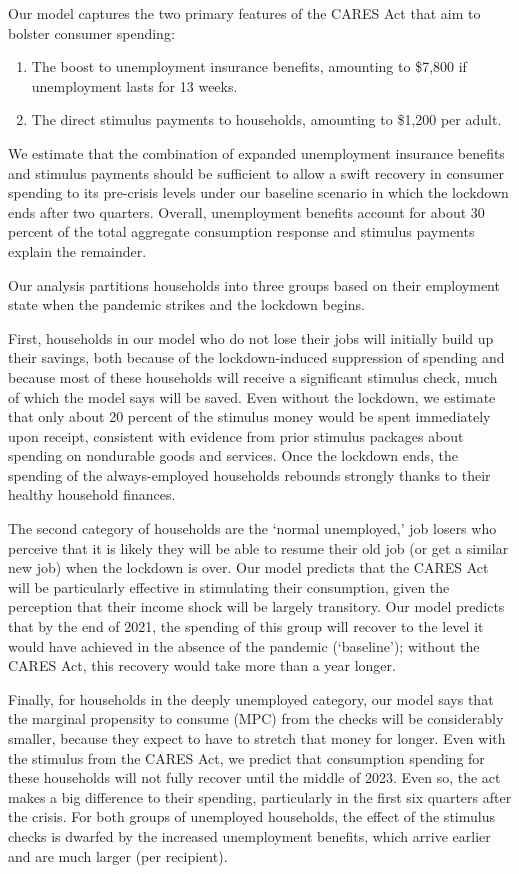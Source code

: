 \documentclass[titlepage]{\econtex}
\begin{document}
Our model captures the two primary features of the CARES Act that aim to bolster consumer spending:
\begin{enumerate}
\item The boost to unemployment insurance benefits, amounting to \$7,800 if unemployment lasts for 13 weeks.
\item The direct stimulus payments to households, amounting to \$1,200 per adult.
\end{enumerate}

We estimate that the combination of expanded unemployment insurance benefits and stimulus payments should be sufficient to allow a swift recovery in consumer spending to its pre-crisis levels under our baseline scenario in which the lockdown ends after two quarters. 
Overall, unemployment benefits account for about 30 percent of the total aggregate consumption response and stimulus payments explain the remainder.

Our analysis partitions households into three groups based on their employment state when the pandemic strikes and the lockdown begins.

First, households in our model who do not lose their jobs will initially build up their savings, both because of the lockdown-induced suppression of spending and because most of these households will receive a significant stimulus check, much of which the model says will be saved.
Even without the lockdown, we estimate that only about 20 percent of the stimulus money would be spent immediately upon receipt, consistent with evidence from prior stimulus packages about spending on nondurable goods and services.
Once the lockdown ends, the spending of the always-employed households rebounds strongly thanks to their healthy household finances.

The second category of households are the `normal unemployed,' job losers who perceive that it is likely they will be able to resume their old job (or get a similar new job) when the lockdown is over.
Our model predicts that the CARES Act will be particularly effective in stimulating their consumption, given the perception that their income shock will be largely transitory.  Our model predicts that by the end of 2021, the spending of this group will recover to the level it would have achieved in the absence of the pandemic (`baseline'); without the CARES Act, this recovery would take more than a year longer.

Finally, for households in the deeply unemployed category, our model says that the marginal propensity to consume (MPC) from the checks will be considerably smaller, because they expect to have to stretch that money for longer.
Even with the stimulus from the CARES Act, we predict that consumption spending for these households will not fully recover until the middle of 2023.
Even so, the act makes a big difference to their spending, particularly in the first six quarters after the crisis.
For both groups of unemployed households, the effect of the stimulus checks is dwarfed by the increased unemployment benefits, which arrive earlier and are much larger (per recipient).
\end{document}
